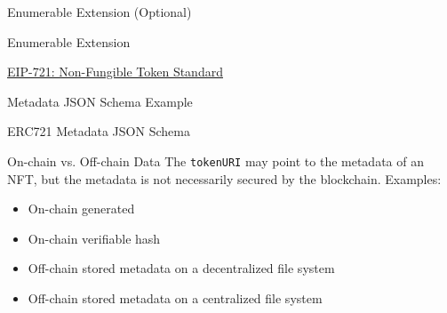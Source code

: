 \documentclass[handout]{beamer}
\begin{document}
\begin{frame}{Enumerable Extension (Optional)}
	\begin{samplecode}{Enumerable Extension}
		
	\end{samplecode}
\vspace{0.5em}
	\link \href{https://eips.ethereum.org/EIPS/eip-721}{EIP-721: Non-Fungible Token Standard}
\end{frame}


\begin{frame}{Metadata JSON Schema Example}
	\begin{samplecode}{ERC721 Metadata JSON Schema}
		
	\end{samplecode}
\end{frame}

\begin{frame}{On-chain vs. Off-chain Data}
	The \texttt{tokenURI} may point to the metadata of an NFT, but the metadata is not necessarily secured by the blockchain. Examples:\\

	\begin{itemize}
		\item<2-> On-chain generated %
		\item<3-> On-chain verifiable hash %
		\item<4-> Off-chain stored metadata on a decentralized file system %
		\item<5-> Off-chain stored metadata on a centralized file system %
	\end{itemize}
\end{frame}
\end{document}
